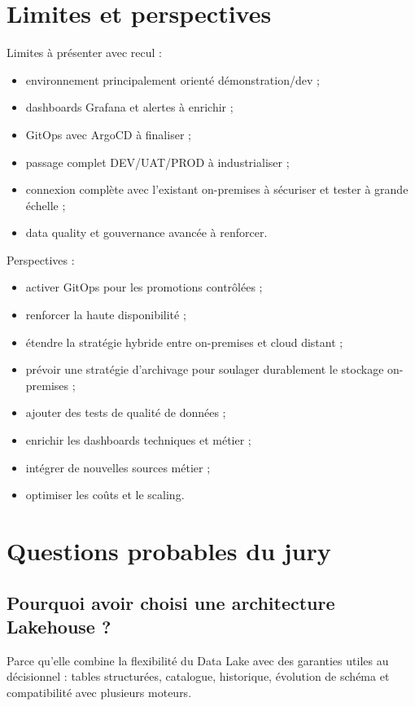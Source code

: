 \documentclass[11pt,a4paper]{article}
\begin{document}
\section{Limites et perspectives}

Limites à présenter avec recul :
\begin{itemize}
  \item environnement principalement orienté démonstration/dev ;
  \item dashboards Grafana et alertes à enrichir ;
  \item GitOps avec ArgoCD à finaliser ;
  \item passage complet DEV/UAT/PROD à industrialiser ;
  \item connexion complète avec l'existant on-premises à sécuriser et tester à grande échelle ;
  \item data quality et gouvernance avancée à renforcer.
\end{itemize}

Perspectives :
\begin{itemize}
  \item activer GitOps pour les promotions contrôlées ;
  \item renforcer la haute disponibilité ;
  \item étendre la stratégie hybride entre on-premises et cloud distant ;
  \item prévoir une stratégie d'archivage pour soulager durablement le stockage on-premises ;
  \item ajouter des tests de qualité de données ;
  \item enrichir les dashboards techniques et métier ;
  \item intégrer de nouvelles sources métier ;
  \item optimiser les coûts et le scaling.
\end{itemize}

\section{Questions probables du jury}

\subsection*{Pourquoi avoir choisi une architecture Lakehouse ?}
Parce qu'elle combine la flexibilité du Data Lake avec des garanties utiles au décisionnel : tables structurées, catalogue, historique, évolution de schéma et compatibilité avec plusieurs moteurs.
\end{document}
